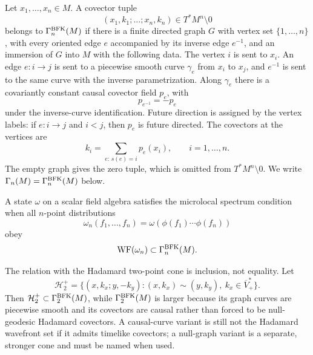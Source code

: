 \begin{definition}
\label{def:microlocal-spectrum-cone}
Let \(x_1,\ldots,x_n\in M\).  A covector tuple
\[
  (x_1,k_1;\ldots;x_n,k_n)\in T^*M^n\setminus0
\]
belongs to \(\Gamma_n^{\rm BFK}(M)\) if there is a finite directed graph
\(G\) with vertex set \(\{1,\ldots,n\}\), with every oriented edge \(e\)
accompanied by its inverse edge \(e^{-1}\), and an immersion of \(G\) into
\(M\) with the following data.  The vertex \(i\) is sent to \(x_i\).  An edge
\(e:i\to j\) is sent to a piecewise smooth curve \(\gamma_e\) from \(x_i\) to
\(x_j\), and \(e^{-1}\) is sent to the same curve with the inverse
parametrization.  Along \(\gamma_e\) there is a covariantly constant causal
covector field \(p_e\), with
\[
  p_{e^{-1}}=-p_e
\]
under the inverse-curve identification.  Future direction is assigned by the
vertex labels: if \(e:i\to j\) and \(i<j\), then \(p_e\) is future directed.
The covectors at the vertices are
\begin{equation}
  k_i
  =
  \sum_{e:\,s(e)=i} p_e(x_i),
  \qquad i=1,\ldots,n .
  \label{eq:microlocal-spectrum-graph-balance}
\end{equation}
The empty graph gives the zero tuple, which is omitted from
\(T^*M^n\setminus0\).  We write \(\Gamma_n(M)=\Gamma_n^{\rm BFK}(M)\) below.
\end{definition}

\begin{definition}
\label{def:microlocal-spectrum-condition-state}
A state \(\omega\) on a scalar field algebra satisfies the microlocal
spectrum condition when all \(n\)-point distributions
\[
  \omega_n(f_1,\ldots,f_n)
  =
  \omega(\phi(f_1)\cdots\phi(f_n))
\]
obey
\begin{equation}
  \operatorname{WF}(\omega_n)\subset\Gamma_n^{\rm BFK}(M).
  \label{eq:microlocal-spectrum-condition-all-n}
\end{equation}
\end{definition}

The relation with the Hadamard two-point cone is inclusion, not equality.
Let
\[
  \mathcal H_2^+
  =
  \{(x,k_x;y,-k_y):(x,k_x)\sim(y,k_y),\ k_x\in\overline V_+^*\}.
\]
Then \(\mathcal H_2^+\subset\Gamma_2^{\rm BFK}(M)\), while
\(\Gamma_2^{\rm BFK}(M)\) is larger because its graph curves are piecewise
smooth and its covectors are causal rather than forced to be null-geodesic
Hadamard covectors.  A causal-curve variant is still not the Hadamard
wavefront set if it admits timelike covectors; a null-graph variant is a
separate, stronger cone and must be named when used.


